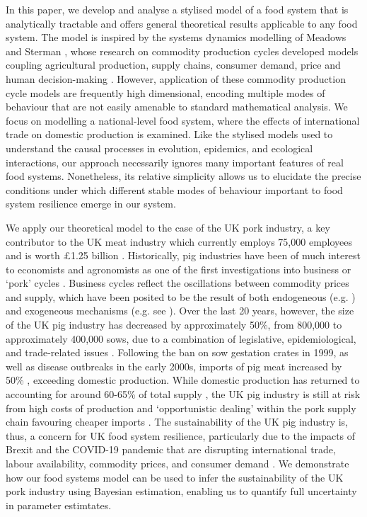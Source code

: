 \documentclass[12pt]{article}
\begin{document}
In this paper, we develop and analyse a stylised model of a food system that is analytically tractable and offers general theoretical results 
applicable to any food system. 
The model is inspired by the systems dynamics modelling of Meadows \cite{meadows1971} and Sterman \cite{sterman2000}, 
whose research on commodity production cycles developed models coupling agricultural production, supply chains, consumer demand, price and human decision-making \cite{meadows1971,sterman2000}. 
However, application of these commodity production cycle models are frequently high dimensional, encoding multiple modes of behaviour that are not easily amenable to standard mathematical analysis. 
We focus on modelling a national-level food system, 
where the effects of international trade on domestic production is examined. 
Like the stylised models used to understand the causal processes in evolution, epidemics, and ecological interactions, 
our approach necessarily ignores many important features of real food systems. 
Nonetheless, its relative simplicity allows us to elucidate the precise conditions under which 
different stable modes of behaviour important to food system resilience emerge in our system.

We apply our theoretical model to the case of the UK pork industry, a key contributor to the UK meat industry which currently employs 75,000 employees and is worth \pounds1.25 billion \cite{DEFRA2019auk18}. Historically, pig industries have been of much interest to economists and agronomists as one of the first investigations into business or `pork' cycles \cite{haldane1934,coase1935,ezekiel1938,harlow1960,meadows1971,zawadzka2010,parker2014,sterman2000}. Business cycles reflect the oscillations between commodity prices and supply, which have been posited to be the result of both endogeneous (e.g. \cite{nerlove1958}) and exogeneous mechanisms (e.g. see \cite{gouel2012}). Over the last 20 years, however, the size of the UK pig industry has decreased by approximately 50\%, from 800,000 to approximately 400,000 sows, due to a combination of legislative, epidemiological, and trade-related issues \cite{taylor2006,dawson2009}. Following the ban on sow gestation crates in 1999, as well as disease outbreaks in the early 2000s, imports of pig meat increased by 50\% \cite{DEFRApigcattlestats2020}, exceeding domestic production. While domestic production has returned to accounting for around 60-65\% of total supply \cite{DEFRApigcattlestats2020}, the UK pig industry is still at risk from high costs of production \cite{BPEXprofitability2011} and `opportunistic dealing' within the pork supply chain favouring cheaper imports \cite{bowman2013}. The sustainability of the UK pig industry is, thus, a concern for UK food system resilience, particularly due to the impacts of Brexit and the COVID-19 pandemic that are disrupting international trade, labour availability, commodity prices, and consumer demand \cite{power2020,feng2017,poppy2019}. We demonstrate how our food systems model can be used to infer the sustainability of the UK pork industry using Bayesian estimation, enabling us to quantify full uncertainty in parameter estimtates.
\end{document}
